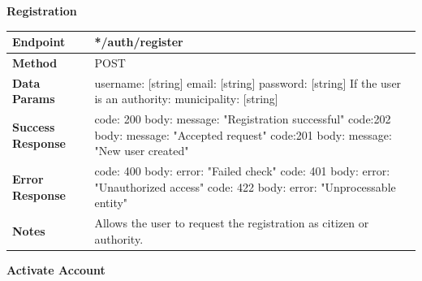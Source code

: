 \documentclass{report}
\begin{document}
\begin{center}{\textbf{Registration}}\end{center}
\begin{tabular}{| l | p{8cm} |}
    \hline
    \textbf{Endpoint} & */auth/register \\
    \hline
    \textbf{Method} & POST \\
    \hline
    \textbf{Data Params} & username: [string] \newline email: [string] \newline password: [string] \newline If the user is an authority: \newline municipality: [string]\\
    \hline
    \textbf{Success Response} & code: 200 \newline body: {message: "Registration successful"} \newline \newline code:202 \newline body: {message: "Accepted request"}
    \newline \newline code:201 \newline body: {message: "New user created"}\\
    \hline
    \textbf{Error Response} & code: 400 \newline body: {error: "Failed check"} \newline \newline code: 401 \newline body: {error: "Unauthorized access"} \newline \newline code: 422 \newline body: {error: "Unprocessable entity"}   \\
    \hline
    \textbf{Notes} & Allows the user to request the registration as citizen or authority. \\
    \hline
\end{tabular}
\begin{center}{\textbf{Activate Account}}\end{center}
\end{document}
